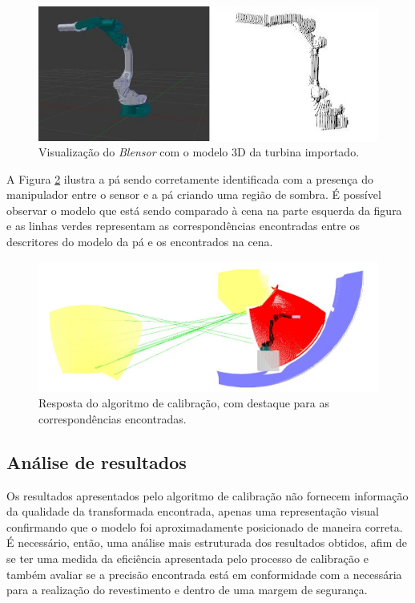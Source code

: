 \begin{figure}[H]
	\centering
	\includegraphics[width=0.9\columnwidth]{method/figs/calibracao/mh12_model}
	\caption{Visualização do \textit{Blensor} com o modelo 3D da turbina
	importado.}
    \label{fig::model_mh12}
\end{figure}

A Figura \ref{fig::sim_mh12}
ilustra a pá sendo corretamente identificada com a presença do manipulador entre
o sensor e a pá criando uma região de sombra. É possível observar o modelo que
está sendo comparado à cena na parte esquerda da figura e as linhas verdes
representam as correspondências encontradas entre os descritores do modelo da pá
e os encontrados na cena.

\begin{figure}[H]
	\centering
	\includegraphics[width=0.9\columnwidth]{method/figs/calibracao/sim_mh12_sp}
	\caption{Resposta do algoritmo de calibração, com destaque para as
	correspondências encontradas.}
    \label{fig::sim_mh12}
\end{figure}	



\subsection{Análise de resultados}

Os resultados apresentados pelo algoritmo de calibração não fornecem informação
da qualidade da transformada encontrada, apenas uma representação visual
confirmando que o modelo foi aproximadamente posicionado de maneira correta.
É necessário, então, uma análise mais estruturada dos resultados obtidos, afim
de se ter uma medida da eficiência apresentada pelo processo de calibração e
também avaliar se a precisão encontrada está em conformidade com a necessária
para a realização do revestimento e dentro de uma margem de segurança.

